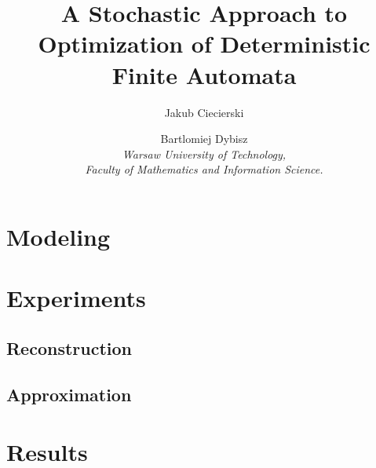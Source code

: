 \documentclass[runningheads, a4paper]{llncs}
\begin{document}
\mainmatter  %

\title{A Stochastic Approach to Optimization of Deterministic Finite Automata}


\author{Jakub Ciecierski \and Bartlomiej Dybisz \\ 
\textit{Warsaw University of Technology, \\
Faculty of Mathematics and Information Science.}}
%

\maketitle

\section{Modeling}

\section{Experiments}

\subsection{Reconstruction}
\subsection{Approximation}

\section{Results}




\newcommand{\saveResultsFirst}[4]{
    \def\TrainSmallFirst{#1}%
    \def\TrainBigFirst{#2}%
    \def\TrainAllFirst{#3}%
    \def\TestFirst{#4}%
}

\newcommand{\saveResultsSecond}[4]{
    \def\TrainSmallSecond{#1}%
    \def\TrainBigSecond{#2}%
    \def\TrainAllSecond{#3}%
    \def\TestSecond{#4}%
}
\end{document}
